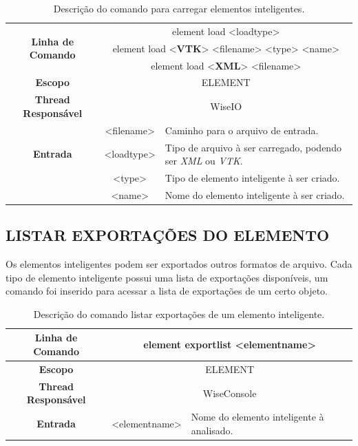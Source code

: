 \begin{center}
	\begin{table}[!htbp]
		\begin{tabular}{|c|c|m{}|}
			\hline
			\multirow{3}{*}{\textbf{Linha de Comando}} & \multicolumn{2}{c|}{element load <load\underline{\space\space}type>} \\
			& \multicolumn{2}{c|}{element load <\textbf{VTK}> <filename> <type> <name>} \\
			& \multicolumn{2}{c|}{element load <\textbf{XML}> <filename>} \\
			\hline
			\textbf{Escopo} & \multicolumn{2}{c|}{ELEMENT} \\
			\hline
			\textbf{Thread Responsável} & \multicolumn{2}{c|}{WiseIO} \\
			\hline
			\multirow{3}{*}{\textbf{Entrada}} & <filename> & Caminho para o arquivo de entrada. \\
			& <load\underline{\space\space}type> & Tipo de arquivo à ser carregado, podendo ser \textit{XML} ou \textit{VTK}. \\
			& <type> & Tipo de elemento inteligente à ser criado. \\
			& <name> & Nome do elemento inteligente à ser criado. \\
			\hline
		\end{tabular}
		\caption{Descrição do comando para carregar elementos inteligentes.}
		\label{tab:load_element}
	\end{table}
\end{center}

\subsection{LISTAR EXPORTAÇÕES DO ELEMENTO}\label{sec:export_list_element}

Os elementos inteligentes podem ser exportados outros formatos de arquivo. Cada tipo de elemento inteligente possui uma lista de exportações disponíveis, um comando foi inserido para acessar a lista de exportações de um certo objeto.

\begin{center}
	\begin{table}[!htbp]
		\begin{tabular}{|c|c|m{}|}
			\hline
			\textbf{Linha de Comando} & \multicolumn{2}{c|}{element export\underline{\space\space}list <element\underline{\space\space}name>}  \\
			\hline
			\textbf{Escopo} & \multicolumn{2}{c|}{ELEMENT} \\
			\hline
			\textbf{Thread Responsável} & \multicolumn{2}{c|}{WiseConsole} \\
			\hline
			\textbf{Entrada} & <element\underline{\space\space}name> & Nome do elemento inteligente à analisado. \\
			\hline
		\end{tabular}
		\caption{Descrição do comando listar exportações de um elemento inteligente.}
		\label{tab:export_list_element}
	\end{table}
\end{center}

